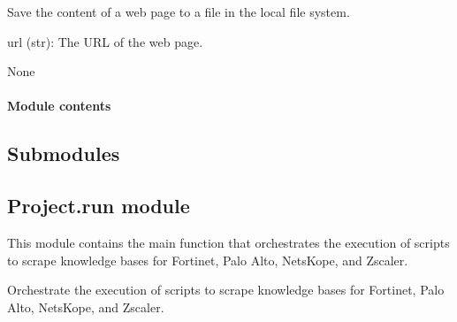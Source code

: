 \documentclass[letterpaper,10pt,english]{sphinxmanual}
\begin{document}
\begin{fulllineitems}
\label{\detokenize{Project.Script:Project.Script.RecupKbZscaler.save_page_content}}
\pysigstartsignatures
{}
\pysigstopsignatures
\sphinxAtStartPar
Save the content of a web page to a file in the local file system.
\begin{description}
\sphinxAtStartPar
url (str): The URL of the web page.

\sphinxAtStartPar
None

\end{description}

\end{fulllineitems}



\paragraph{Module contents}
\label{\detokenize{Project.Script:module-Project.Script}}\label{\detokenize{Project.Script:module-contents}}

\subsection{Submodules}
\label{\detokenize{Project:submodules}}

\subsection{Project.run module}
\label{\detokenize{Project:module-Project.run}}\label{\detokenize{Project:project-run-module}}
\sphinxAtStartPar
This module contains the main function that orchestrates the execution of scripts to scrape knowledge bases for Fortinet, Palo Alto, NetsKope, and Zscaler.

\begin{fulllineitems}
\label{\detokenize{Project:Project.run.main}}
\pysigstartsignatures
{}
\pysigstopsignatures
\sphinxAtStartPar
Orchestrate the execution of scripts to scrape knowledge bases for Fortinet, Palo Alto, NetsKope, and Zscaler.

\end{fulllineitems}
\end{document}
